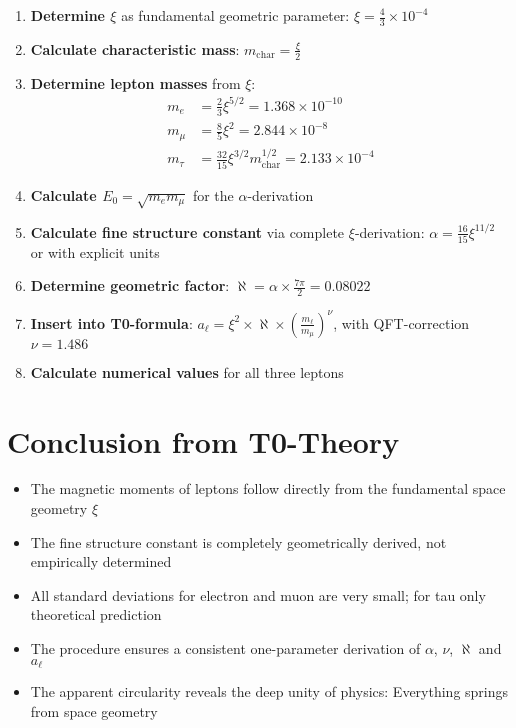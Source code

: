 \documentclass[12pt,a4paper]{article}
\newcommand{\xipar}{\xi}
\newcommand{\nulep}{\nu}
\newcommand{\mchar}{m_{\text{char}}}
\newcommand{\Ezero}{E_0}
\begin{document}
	\begin{enumerate}
		\item \textbf{Determine $\xipar$} as fundamental geometric parameter: $\xipar = \frac{4}{3} \times 10^{-4}$
		\item \textbf{Calculate characteristic mass}: $\mchar = \frac{\xipar}{2}$
		\item \textbf{Determine lepton masses} from $\xipar$:
		\begin{align}
			m_e &= \frac{2}{3} \xipar^{5/2} = 1{.}368 \times 10^{-10} \\
			m_\mu &= \frac{8}{5} \xipar^2 = 2{.}844 \times 10^{-8} \\
			m_\tau &= \frac{32}{15} \xipar^{3/2} \mchar^{1/2} = 2{.}133 \times 10^{-4}
		\end{align}
		\item \textbf{Calculate $\Ezero = \sqrt{m_e m_\mu}$} for the $\alpha$-derivation
		\item \textbf{Calculate fine structure constant} via complete $\xipar$-derivation: $\alpha = \frac{16}{15} \xipar^{11/2}$ or with explicit units
		\item \textbf{Determine geometric factor}: $\aleph = \alpha \times \frac{7\pi}{2} = 0{.}08022$
		\item \textbf{Insert into T0-formula}: $a_\ell = \xipar^2 \times \aleph \times \left(\frac{m_\ell}{m_\mu}\right)^\nulep$, with QFT-correction $\nulep = 1{.}486$
		\item \textbf{Calculate numerical values} for all three leptons
	\end{enumerate}
	
	\section{Conclusion from T0-Theory}
	
	\begin{itemize}
		\item The magnetic moments of leptons follow directly from the fundamental space geometry $\xipar$
		\item The fine structure constant is completely geometrically derived, not empirically determined
		\item All standard deviations for electron and muon are very small; for tau only theoretical prediction
		\item The procedure ensures a consistent one-parameter derivation of $\alpha$, $\nulep$, $\aleph$ and $a_\ell$
		\item The apparent circularity reveals the deep unity of physics: Everything springs from space geometry
	\end{itemize}
	
\end{document}
